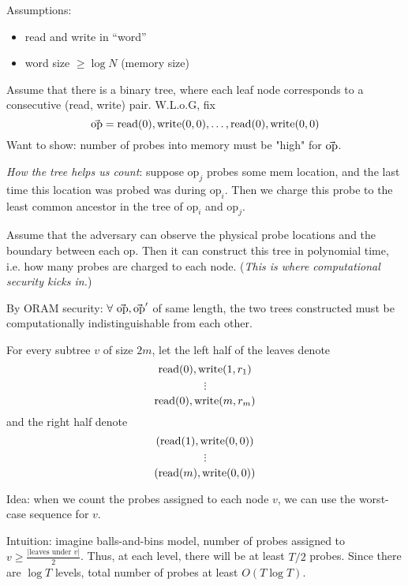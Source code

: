 \noindent Assumptions:
\begin{itemize}
  \item read and write in ``word''
  \item word size $\geq \log N$ (memory size)
\end{itemize}

Assume that there is a binary tree, where each leaf node corresponds to a consecutive (read, write) pair. W.L.o.G, fix 
$$\vec{\mbox{op}} = \mbox{read}(0), \mbox{write}(0, 0), \dots, \mbox{read}(0), \mbox{write}(0, 0)$$
Want to show: number of probes into memory must be "high" for $\vec{\mbox{op}}$.

\noindent \emph{How the tree helps us count}: suppose $\mbox{op}_j$ probes some mem location, and the last time this location was probed was during $\mbox{op}_i$. Then we charge this probe to the least common ancestor in the tree of $\mbox{op}_i$ and $\mbox{op}_j$.


Assume that the adversary can observe the physical probe locations and the boundary between each $\mbox{op}$. Then it can construct this tree in polynomial time, i.e. how many probes are charged to each node. (\emph{This is where computational security kicks in.})

By ORAM security: $\forall\ \vec{\mbox{op}}, \vec{\mbox{op}}'$ of same length, the two trees constructed must be computationally indistinguishable from each other.

For every subtree $v$ of size $2m$, let the left half of the leaves denote
$$\mbox{read}(0), \mbox{write}(1, r_1)$$
$$\vdots$$
$$\mbox{read}(0), \mbox{write}(m, r_m)$$
and the right half denote
$$(\mbox{read}(1), \mbox{write}(0, 0))$$
$$\vdots$$
$$(\mbox{read}(m), \mbox{write}(0, 0))$$

Idea: when we count the probes assigned to each node $v$, we can use the worst-case sequence for $v$.

Intuition: imagine balls-and-bins model, number of probes assigned to $v \geq\frac{|\mbox{leaves under } v|}{2}$. Thus, at each level, there will be at least $T/2$ probes. Since there are $\log T$ levels, total number of probes at least $O(T \log T)$.

